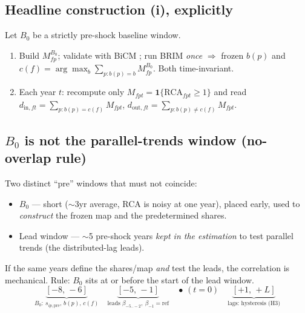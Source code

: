 \documentclass[11pt]{article}
\begin{document}
\subsection{Headline construction (i), explicitly}
Let $B_0$ be a strictly pre-shock baseline window.
\begin{enumerate}[label=(\arabic*),leftmargin=1.8em,noitemsep]
  \item Build $M^{B_0}_{fp}$; validate with BiCM \citep{squartini2011,saracco2015,cimini2022};
        run BRIM \citep{barber2007} \emph{once} $\Rightarrow$ frozen $b(p)$ and
        $c(f)=\arg\max_b\sum_{p:b(p)=b}M^{B_0}_{fp}$. Both time-invariant.
  \item Each year $t$: recompute only $M_{fpt}=\mathbf 1\{\mathrm{RCA}_{fpt}\ge1\}$
        and read
        $d_{\mathrm{in},ft}=\sum_{p:b(p)=c(f)}M_{fpt}$,
        $d_{\mathrm{out},ft}=\sum_{p:b(p)\ne c(f)}M_{fpt}$.
\end{enumerate}

\subsection{$B_0$ is not the parallel-trends window (no-overlap rule)}
Two distinct ``pre'' windows that must not coincide:
\begin{itemize}[leftmargin=1.4em,noitemsep]
  \item $B_0$ --- short ($\sim$3yr average, RCA is noisy at one year), placed early,
        used to \emph{construct} the frozen map and the predetermined shares.
  \item Lead window --- $\sim$5 pre-shock years \emph{kept in the estimation} to
        test parallel trends (the distributed-lag leads).
\end{itemize}
If the same years define the shares/map \emph{and} test the leads, the correlation
is mechanical. Rule: $B_0$ sits at or before the start of the lead window.
\[
  \underbrace{[-8,\,-6]}_{B_0:\ s_{ip,\mathrm{pre}},\,b(p),\,c(f)}
  \quad
  \underbrace{[-5,\,-1]}_{\text{leads }\beta_{-5..-2},\ \beta_{-1}=\text{ref}}
  \quad \bullet\,(t{=}0)\quad
  \underbrace{[+1,\,+L]}_{\text{lags: hysteresis (H3)}}
\]
\end{document}
